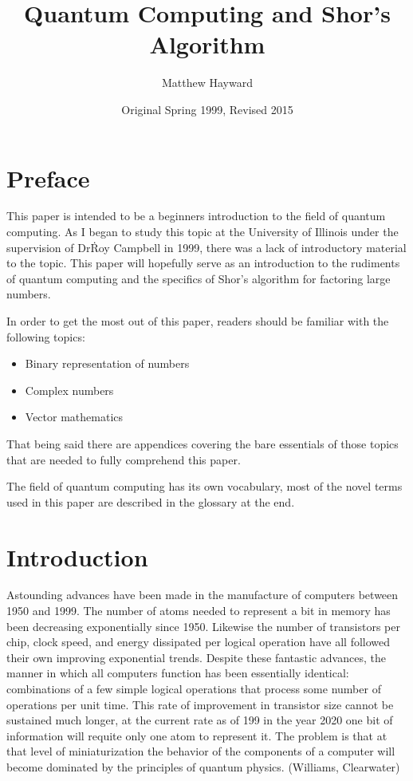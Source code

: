 \documentclass[]{article}
\begin{document}
\title{Quantum Computing and Shor's Algorithm}
\date{Original Spring 1999, Revised 2015}
\author{Matthew Hayward}
\maketitle
\pagebreak

\tableofcontents
\pagebreak

\section{Preface}

This paper is intended to be a beginners introduction to the field of
quantum computing. As I began to study this topic at the University of
Illinois under the supervision of Dr\. Roy Campbell in 1999, there was
a lack of introductory material to the topic. This paper will
hopefully serve as an introduction to the rudiments of quantum
computing and the specifics of Shor's algorithm for factoring large
numbers.

In order to get the most out of this paper, readers should be familiar
with the following topics:
\begin{itemize}
	\item Binary representation of numbers
	\item Complex numbers
	\item Vector mathematics
\end{itemize}
That being said there are appendices covering the bare essentials of
those topics that are needed to fully comprehend this paper.

The field of quantum computing has its own vocabulary, most of the
novel terms used in this paper are described in the glossary at the
end.

\section{Introduction}

Astounding advances have been made in the manufacture of computers
between 1950 and 1999.  The number of atoms needed to represent a bit
in memory has been decreasing exponentially since 1950.  Likewise the
number of transistors per chip, clock speed, and energy dissipated per
logical operation have all followed their own improving exponential
trends.  Despite these fantastic advances, the manner in which all
computers function has been essentially identical: combinations of a
few simple logical operations that process some number of operations
per unit time.  This rate of improvement in transistor size cannot be
sustained much longer, at the current rate as of 199 in the year 2020
one bit of information will requite only one atom to represent it.
The problem is that at that level of miniaturization the behavior of
the components of a computer will become dominated by the principles
of quantum physics.  (Williams, Clearwater)
\end{document}
